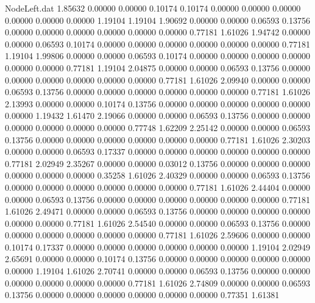 \begin{filecontents}{NodeLeft.dat}
   1.85632    0.00000    0.00000     0.10174    0.10174    0.00000    0.00000    0.00000    0.00000    0.00000    0.00000    1.19104    1.19104
   1.90692    0.00000    0.00000     0.06593    0.13756    0.00000    0.00000    0.00000    0.00000    0.00000    0.00000    0.77181    1.61026
   1.94742    0.00000    0.00000     0.06593    0.10174    0.00000    0.00000    0.00000    0.00000    0.00000    0.00000    0.77181    1.19104
   1.99806    0.00000    0.00000     0.06593    0.10174    0.00000    0.00000    0.00000    0.00000    0.00000    0.00000    0.77181    1.19104
   2.04875    0.00000    0.00000     0.06593    0.13756    0.00000    0.00000    0.00000    0.00000    0.00000    0.00000    0.77181    1.61026
   2.09940    0.00000    0.00000     0.06593    0.13756    0.00000    0.00000    0.00000    0.00000    0.00000    0.00000    0.77181    1.61026
   2.13993    0.00000    0.00000     0.10174    0.13756    0.00000    0.00000    0.00000    0.00000    0.00000    0.00000    1.19432    1.61470
   2.19066    0.00000    0.00000     0.06593    0.13756    0.00000    0.00000    0.00000    0.00000    0.00000    0.00000    0.77748    1.62209
   2.25142    0.00000    0.00000     0.06593    0.13756    0.00000    0.00000    0.00000    0.00000    0.00000    0.00000    0.77181    1.61026
   2.30203    0.00000    0.00000     0.06593    0.17337    0.00000    0.00000    0.00000    0.00000    0.00000    0.00000    0.77181    2.02949
   2.35267    0.00000    0.00000     0.03012    0.13756    0.00000    0.00000    0.00000    0.00000    0.00000    0.00000    0.35258    1.61026
   2.40329    0.00000    0.00000     0.06593    0.13756    0.00000    0.00000    0.00000    0.00000    0.00000    0.00000    0.77181    1.61026
   2.44404    0.00000    0.00000     0.06593    0.13756    0.00000    0.00000    0.00000    0.00000    0.00000    0.00000    0.77181    1.61026
   2.49471    0.00000    0.00000     0.06593    0.13756    0.00000    0.00000    0.00000    0.00000    0.00000    0.00000    0.77181    1.61026
   2.54540    0.00000    0.00000     0.06593    0.13756    0.00000    0.00000    0.00000    0.00000    0.00000    0.00000    0.77181    1.61026
   2.59606    0.00000    0.00000     0.10174    0.17337    0.00000    0.00000    0.00000    0.00000    0.00000    0.00000    1.19104    2.02949
   2.65691    0.00000    0.00000     0.10174    0.13756    0.00000    0.00000    0.00000    0.00000    0.00000    0.00000    1.19104    1.61026
   2.70741    0.00000    0.00000     0.06593    0.13756    0.00000    0.00000    0.00000    0.00000    0.00000    0.00000    0.77181    1.61026
   2.74809    0.00000    0.00000     0.06593    0.13756    0.00000    0.00000    0.00000    0.00000    0.00000    0.00000    0.77351    1.61381

\end{filecontents}

